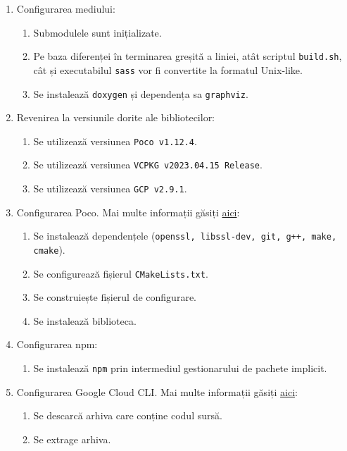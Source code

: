 \begin{enumerate}
  \item Configurarea mediului:
    \begin{enumerate}
      \item Submodulele sunt inițializate.
      \item Pe baza diferenței în terminarea greșită a liniei, atât scriptul \texttt{build.sh}, cât și executabilul \texttt{sass} vor fi convertite la formatul Unix-like.
      \item Se instalează \texttt{doxygen} și dependența sa \texttt{graphviz}.
    \end{enumerate}
  \item Revenirea la versiunile dorite ale bibliotecilor:
    \begin{enumerate}
      \item Se utilizează versiunea \texttt{Poco v1.12.4}.
      \item Se utilizează versiunea \texttt{VCPKG v2023.04.15 Release}.
      \item Se utilizează versiunea \texttt{GCP v2.9.1}.
    \end{enumerate}
  \item Configurarea Poco. Mai multe informații găsiți \href{https://github.com/pocoproject/poco}{aici}:
    \begin{enumerate}
      \item Se instalează dependențele (\texttt{openssl, libssl-dev, git, g++, make, cmake}).
      \item Se configurează fișierul \texttt{CMakeLists.txt}.
      \item Se construiește fișierul de configurare.
      \item Se instalează biblioteca.
    \end{enumerate}
  \item Configurarea npm:
    \begin{enumerate}
      \item Se instalează \texttt{npm} prin intermediul gestionarului de pachete implicit.
    \end{enumerate}
  \item Configurarea Google Cloud CLI. Mai multe informații găsiți \href{https://cloud.google.com/sdk/docs/install}{aici}:
    \begin{enumerate}
      \item Se descarcă arhiva care conține codul sursă.
      \item Se extrage arhiva.
    \end{enumerate}

\end{enumerate}
